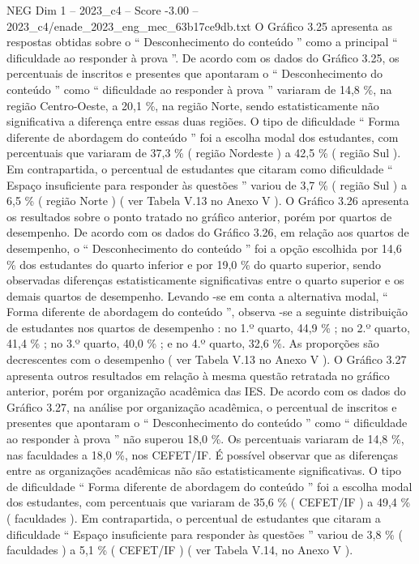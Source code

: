 \begin{textsample}{NEG Dim 1 – 2023\_c4 – Score -3.00 – 2023\_c4/enade\_2023\_eng\_mec\_63b17ce9db.txt}
O Gráfico 3.25 apresenta as respostas obtidas sobre o “ Desconhecimento do conteúdo ” como a principal “ dificuldade ao responder à prova ”.
De acordo com os dados do Gráfico 3.25, os percentuais de inscritos e presentes que apontaram o “ Desconhecimento do conteúdo ” como “ dificuldade ao responder à prova ” variaram de 14,8 \%, na região Centro-Oeste, a 20,1 \%, na região Norte, sendo estatisticamente não significativa a diferença entre essas duas regiões.
O tipo de dificuldade “ Forma diferente de abordagem do conteúdo ” foi a escolha modal dos estudantes, com percentuais que variaram de 37,3 \% ( região Nordeste ) a 42,5 \% ( região Sul ).
Em contrapartida, o percentual de estudantes que citaram como dificuldade “ Espaço insuficiente para responder às questões ” variou de 3,7 \% ( região Sul ) a 6,5 \% ( região Norte ) ( ver Tabela V.13 no Anexo V ).
O Gráfico 3.26 apresenta os resultados sobre o ponto tratado no gráfico anterior, porém por quartos de desempenho.
De acordo com os dados do Gráfico 3.26, em relação aos quartos de desempenho, o “ Desconhecimento do conteúdo ” foi a opção escolhida por 14,6 \% dos estudantes do quarto inferior e por 19,0 \% do quarto superior, sendo observadas diferenças estatisticamente significativas entre o quarto superior e os demais quartos de desempenho.
Levando -se em conta a alternativa modal, “ Forma diferente de abordagem do conteúdo ”, observa -se a seguinte distribuição de estudantes nos quartos de desempenho : no 1.º quarto, 44,9 \% ; no 2.º quarto, 41,4 \% ; no 3.º quarto, 40,0 \% ; e no 4.º quarto, 32,6 \%.
As proporções são decrescentes com o desempenho ( ver Tabela V.13 no Anexo V ).
O Gráfico 3.27 apresenta outros resultados em relação à mesma questão retratada no gráfico anterior, porém por organização acadêmica das IES.
De acordo com os dados do Gráfico 3.27, na análise por organização acadêmica, o percentual de inscritos e presentes que apontaram o “ Desconhecimento do conteúdo ” como “ dificuldade ao responder à prova ” não superou 18,0 \%.
Os percentuais variaram de 14,8 \%, nas faculdades a 18,0 \%, nos CEFET/IF.
É possível observar que as diferenças entre as organizações acadêmicas não são estatisticamente significativas.
O tipo de dificuldade “ Forma diferente de abordagem do conteúdo ” foi a escolha modal dos estudantes, com percentuais que variaram de 35,6 \% ( CEFET/IF ) a 49,4 \% ( faculdades ).
Em contrapartida, o percentual de estudantes que citaram a dificuldade “ Espaço insuficiente para responder às questões ” variou de 3,8 \% ( faculdades ) a 5,1 \% ( CEFET/IF ) ( ver Tabela V.14, no Anexo V ).

\end{textsample}
